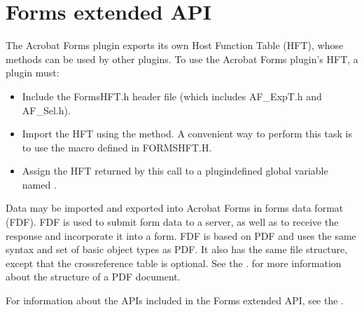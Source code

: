 \documentclass[letterpaper,12pt,english,openany,oneside]{sphinxmanual}
\begin{document}
\section{Forms extended API}
\label{\detokenize{Plugins_ExtendedAPI:forms-extended-api}}
The Acrobat Forms plugin exports its own Host Function Table (HFT), whose methods can be used by other plugins. To use the Acrobat Forms plugin’s HFT, a plugin must:
\begin{itemize}
\item {} 
Include the FormsHFT.h header file (which includes AF\_ExpT.h and AF\_Sel.h).

\item {} 
Import the HFT using the  method. A convenient way to perform this task is to use the  macro defined in FORMSHFT.H.

\end{itemize}

\begin{sphinxVerbatim}[commandchars=\\\{\}]
\end{sphinxVerbatim}
\begin{itemize}
\item {} 
Assign the HFT returned by this call to a plugin\sphinxhyphen{}defined global variable named .

\end{itemize}

Data may be imported and exported into Acrobat Forms in forms data format (FDF). FDF is used to submit form data to a server, as well as to receive the response and incorporate it into a form. FDF is based on PDF and uses the same syntax and set of basic object types as PDF. It also has the same file structure, except that the cross\sphinxhyphen{}reference table is optional. See the . for more information about the structure of a PDF document.

For information about the APIs included in the Forms extended API, see the .
\end{document}
